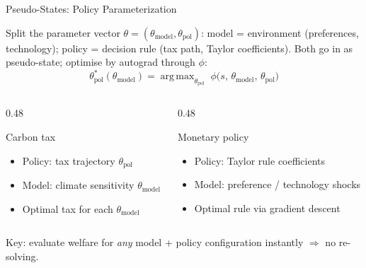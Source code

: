 \documentclass[aspectratio=169,11pt]{beamer}
\newcommand{\emphc}[1]{\textcolor{harvardcrimson}{#1}}
\DeclareMathOperator*{\argmax}{arg\,max}
\begin{document}
\begin{frame}{Pseudo-States: Policy Parameterization}
\begin{block}{Split the parameter vector}
\small
$\theta = (\theta_{\text{model}}, \theta_{\text{pol}})$: \emphc{model} = environment (preferences, technology); \emphc{policy} = decision rule (tax path, Taylor coefficients). Both go in as pseudo-state; optimise by autograd through $\phi$:
\vspace{-4pt}
\[
\theta_{\text{pol}}^*(\theta_{\text{model}}) = \argmax_{\theta_{\text{pol}}} \;\phi\bigl(s,\, \theta_{\text{model}},\, \theta_{\text{pol}}\bigr)
\]
\vspace{-6pt}
\end{block}

\vspace{0.1cm}
\begin{columns}[T]
\begin{column}{0.48\textwidth}
\begin{exampleblock}{Carbon tax}
\begin{itemize}\setlength{\itemsep}{0pt}
  \item Policy: tax trajectory $\theta_{\text{pol}}$
  \item Model: climate sensitivity $\theta_{\text{model}}$
  \item Optimal tax for each $\theta_{\text{model}}$
\end{itemize}
\end{exampleblock}
\end{column}
\begin{column}{0.48\textwidth}
\begin{exampleblock}{Monetary policy}
\begin{itemize}\setlength{\itemsep}{0pt}
  \item Policy: Taylor rule coefficients
  \item Model: preference / technology shocks
  \item Optimal rule via gradient descent
\end{itemize}
\end{exampleblock}
\end{column}
\end{columns}

\vspace{0.15cm}
\emphc{Key:} evaluate welfare for \emph{any} model + policy configuration instantly $\Rightarrow$ no re-solving.
\end{frame}
\end{document}
